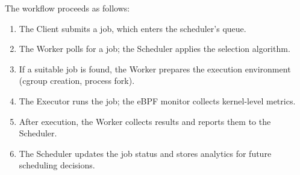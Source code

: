 The workflow proceeds as follows:
\begin{enumerate}
	\item The Client submits a job, which enters the scheduler's queue.
	\item The Worker polls for a job; the Scheduler applies the selection algorithm.
	\item If a suitable job is found, the Worker prepares the execution environment (cgroup creation, process fork).
	\item The Executor runs the job; the eBPF monitor collects kernel-level metrics.
	\item After execution, the Worker collects results and reports them to the Scheduler.
	\item The Scheduler updates the job status and stores analytics for future scheduling decisions.
\end{enumerate}
